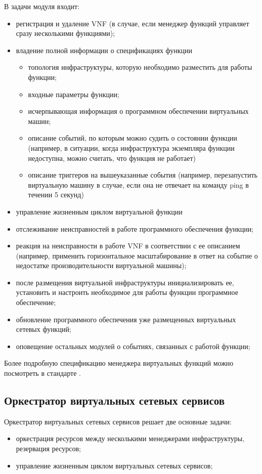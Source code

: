 \documentclass[oneside,final,14pt,a4paper]{extreport}
\begin{document}
В задачи модуля входит:

\begin{itemize}
	\item регистрация и удаление VNF (в случае, если менеджер функций управляет сразу несколькими функциями);
	\item владение полной информации о спецификациях функции
	\begin{itemize}
		\item топология инфраструктуры, которую необходимо разместить для работы функции;
		\item входные параметры функции;
		\item исчерпывающая информация о программном обеспечении виртуальных машин;
		\item описание событий, по которым можно судить о состоянии функции (например, в ситуации, когда инфраструктура экземпляра функции недоступна, можно считать, что функция не работает)
		\item описание триггеров на вышеуказанные события (например, перезапустить виртуальную машину в случае, если она не отвечает на команду ping в течении 5 секунд)
	\end{itemize}
	\item управление жизненным циклом виртуальной функции
	\item отслеживание неисправностей в работе программного обеспечения функции;
	\item реакция на неисправности в работе VNF в соответствии с ее описанием (например, применить горизонтальное масштабирование в ответ на событие о недостатке производительности виртуальной машины);
	\item после размещения виртуальной инфраструктуры инициализировать ее, установить и настроить необходимое для работы функции программное обеспечение;
	\item обновление программного обеспечения уже размещенных виртуальных сетевых функций;
	\item оповещение остальных модулей о событиях, связанных с работой функции;
\end{itemize}

Более подробную спецификацию менеджера виртуальных функций можно посмотреть в стандарте \cite{nfv-mano-official-2016-04}.

\subsection{Оркестратор виртуальных сетевых сервисов}
Оркестратор виртуальных сетевых сервисов решает две основные задачи:
\begin{itemize}
	\item оркестрация ресурсов между несколькими менеджерами инфраструктуры, резервация ресурсов;
	\item управление жизненным циклом виртуальных сетевых сервисов;
\end{itemize}
\end{document}
